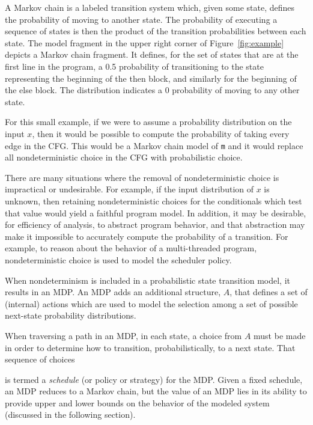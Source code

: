 A Markov chain is a labeled transition system which, given some
state, defines the probability of moving to another state.
The probability of executing a sequence of states is then the
product of the transition probabilities between each state.
The model fragment in the upper right corner of 
Figure~\ref{fig:example} depicts a Markov chain fragment.
It defines, for the set of states 
that are at the first line in the program, 
a 0.5 probability of transitioning to 
the state representing the beginning of the then block,
and similarly for the beginning of the else block.  The
distribution indicates a 0 probability of moving to any
other state.

For this small example, if we were to assume a probability
distribution on the input $x$, then it would be possible
to compute the probability of taking every edge in the CFG.   
This would be a Markov chain model of {\tt m} and it would replace
all nondeterministic choice in the CFG with probabilistic choice.

There are many situations where the removal of nondeterministic
choice is impractical or undesirable.  For example, if the input
distribution of $x$ is unknown, then retaining nondeterministic
choices for the conditionals which test that value would yield a
faithful program model.  In addition, it may be desirable, for
efficiency of analysis, to abstract program behavior, and that
abstraction may make it impossible to accurately compute the 
probability of a transition.  For example, to reason about the
behavior of a multi-threaded program, nondeterministic choice is
used to model the scheduler policy.

When nondeterminism is included in a probabilistic state
transition model, it results in an MDP.  
An MDP adds an additional structure, $A$, that defines
a set of (internal) actions which are used to model the
selection among a set of possible next-state probability distributions.
When traversing a path in an MDP, in each state, a choice
from $A$ must be made in order to determine how to transition,
probabilistically, to a next state.   That sequence of choices
 is termed a \textit{schedule} (or policy or 
strategy) for the MDP.
Given a fixed schedule, an MDP reduces to a Markov chain, but
the value of an MDP lies in its ability to provide upper and
lower bounds on the behavior of the modeled system (discussed
in the following section).
